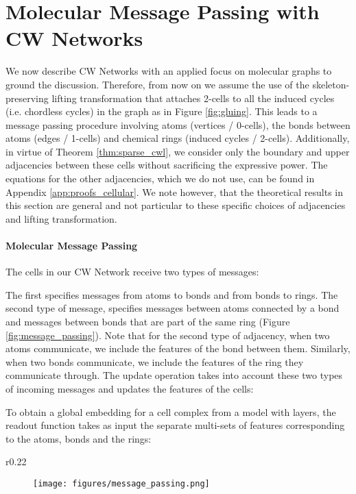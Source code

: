 \documentclass{article}
\begin{document}
\section{Molecular Message Passing with CW Networks}
\label{sec:CWN_MMP}

We now describe CW Networks with an applied focus on molecular graphs to ground the discussion. Therefore, from now on we assume the use of the skeleton-preserving lifting transformation that attaches 2-cells to all the induced cycles (i.e. chordless cycles) in the graph as in Figure \ref{fig:gluing}. This leads to a message passing procedure involving atoms (vertices / 0-cells), the bonds between atoms (edges / 1-cells) and chemical rings (induced cycles / 2-cells). Additionally, in virtue of Theorem \ref{thm:sparse_cwl}, we consider only the boundary and upper adjacencies between these cells without sacrificing the expressive power. The equations for the other adjacencies, which we do not use, can be found in Appendix \ref{app:proofs_cellular}. We note however, that the theoretical results in this section are general and not particular to these specific choices of adjacencies and lifting transformation. 

\paragraph{Molecular Message Passing} The cells in our CW Network receive two types of messages: 

The first specifies messages from atoms to bonds and from bonds to rings. The second type of message, specifies messages between atoms connected by a bond and messages between bonds that are part of the same ring (Figure \ref{fig:message_passing}). Note that for the second type of adjacency, when two atoms communicate, we include the features of the bond between them. Similarly, when two bonds communicate, we include the features of the ring they communicate through. 
The update operation takes into account these two types of incoming messages and updates the features of the cells:

To obtain a global embedding for a cell complex  from a model with  layers, the readout function takes as input the separate multi-sets of features corresponding to the atoms, bonds and the rings:


\begin{wrapfigure}[]{r}{0.22\textwidth}
    \begin{subfigure}[t!]{1.0\linewidth}
        \centering
        \vspace{-10pt}
        \texttt{[image: figures/message\_passing.png]}
    \end{subfigure}
    \caption{Hierarchical depiction of the message passing procedure. \textcolor{orange}{Orange} arrows indicate boundary messages received by cells  and , while \textcolor{BlueViolet}{blue} ones show upper messages received by cells  and .}
    \label{fig:message_passing}
    \vspace{-40pt}
\end{wrapfigure}
\end{document}
